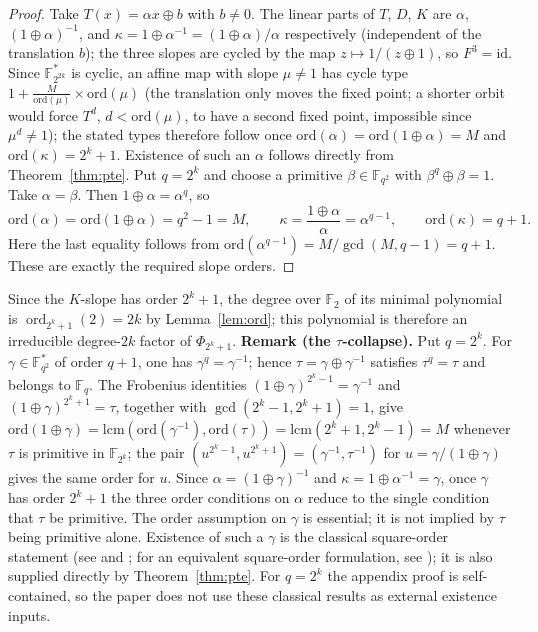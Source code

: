 \documentclass[11pt]{article}
\begin{document}
\begin{proof}
Take $T(x)=\alpha x\oplus b$ with $b\ne0$. The linear parts of $T$, $D$, $K$ are
$\alpha$, $(1\oplus\alpha)^{-1}$, and
$\kappa=1\oplus\alpha^{-1}=(1\oplus\alpha)/\alpha$
respectively (independent of the translation $b$); the three slopes are cycled by
the map $z\mapsto 1/(z\oplus1)$, so $F^3=\mathrm{id}$. Since
$\mathbb{F}_{2^{2k}}^*$ is cyclic, an affine map with slope $\mu\ne1$ has cycle type
$1+\frac{M}{\mathrm{ord}(\mu)}\times\mathrm{ord}(\mu)$ (the translation only moves the
fixed point; a shorter orbit would force $T^d$, $d<\mathrm{ord}(\mu)$, to have a second
fixed point, impossible since $\mu^d\ne1$); the stated types therefore follow once
$\mathrm{ord}(\alpha)=\mathrm{ord}(1\oplus\alpha)=M$ and
$\mathrm{ord}(\kappa)=2^k+1$. Existence of such an $\alpha$ follows directly from Theorem~\ref{thm:pte}.
Put $q=2^k$ and choose a primitive $\beta\in\mathbb F_{q^2}$ with
$\beta^q\oplus\beta=1$. Take $\alpha=\beta$. Then $1\oplus\alpha=\alpha^q$,
so
\[
\mathrm{ord}(\alpha)=\mathrm{ord}(1\oplus\alpha)=q^2-1=M,
\qquad
\kappa=\frac{1\oplus\alpha}{\alpha}=\alpha^{q-1},
\qquad \mathrm{ord}(\kappa)=q+1.
\]
Here the last equality follows from
$\mathrm{ord}(\alpha^{q-1})=M/\gcd(M,q-1)=q+1$.
These are exactly the required slope orders.
\end{proof}
Since the $K$-slope has order $2^k+1$, the degree over $\mathbb{F}_2$ of its
minimal polynomial is $\operatorname{ord}_{2^k+1}(2)=2k$ by
Lemma~\ref{lem:ord}; this polynomial is therefore an irreducible degree-$2k$
factor of $\Phi_{2^k+1}$.
\textbf{Remark (the $\tau$-collapse).}
Put $q=2^k$. For $\gamma\in\mathbb F_{q^2}^*$ of order $q+1$,
one has $\gamma^q=\gamma^{-1}$; hence
$\tau=\gamma\oplus\gamma^{-1}$ satisfies $\tau^q=\tau$ and belongs to
$\mathbb F_q$. The Frobenius identities
$(1\oplus\gamma)^{2^k-1}=\gamma^{-1}$ and $(1\oplus\gamma)^{2^k+1}=\tau$,
together with $\gcd(2^k-1,2^k+1)=1$, give
$\mathrm{ord}(1\oplus\gamma)=\mathrm{lcm}(\mathrm{ord}(\gamma^{-1}),\mathrm{ord}(\tau))
=\mathrm{lcm}(2^k+1,2^k-1)=M$ whenever $\tau$ is primitive in $\mathbb{F}_{2^k}$;
the pair $(u^{2^k-1},u^{2^k+1})=(\gamma^{-1},\tau^{-1})$ for
$u=\gamma/(1\oplus\gamma)$ gives the same order for $u$. Since
$\alpha=(1\oplus\gamma)^{-1}$ and
$\kappa=1\oplus\alpha^{-1}=\gamma$, once $\gamma$
has order $2^k+1$ the three order conditions on $\alpha$ reduce to the single
condition that $\tau$ be primitive. The order assumption on $\gamma$ is
essential; it is not implied by $\tau$ being primitive alone.
Existence of such a $\gamma$ is the classical square-order statement
(see \cite{Mor} and \cite[Theorem~1, p.~1]{Coh90}; for an equivalent square-order formulation, see
\cite[Theorem~1.5, p.~170]{Coh}); it is also supplied directly by
Theorem~\ref{thm:pte}.
For $q=2^k$ the appendix proof is self-contained, so the paper does not use these
classical results as external existence inputs.
\end{document}
